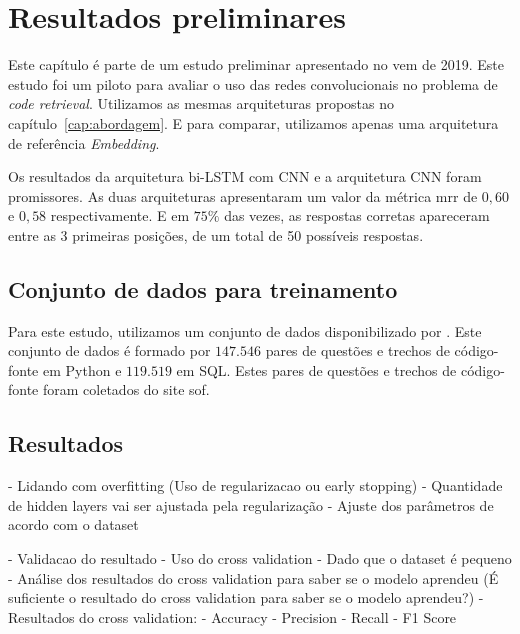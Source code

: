 \chapter{Resultados preliminares}
\label{cap:resultados-preliminares}

Este capítulo é parte de um estudo preliminar \citep{marcelo-vem-2019} apresentado no \acrfull{vem} de 2019. Este estudo foi um piloto para avaliar o uso das redes convolucionais no problema de \textit{code retrieval}. Utilizamos as mesmas arquiteturas propostas no capítulo~\ref{cap:abordagem}. E para comparar, utilizamos apenas uma arquitetura de referência \textit{Embedding}.

Os resultados da arquitetura bi-LSTM com CNN e a arquitetura CNN foram promissores. As duas arquiteturas apresentaram um valor da métrica \acrfull{mrr} de $0,60$ e $0,58$ respectivamente. E em $75\%$ das vezes, as respostas corretas apareceram entre as 3 primeiras posições, de um total de 50 possíveis respostas.

\section{Conjunto de dados para treinamento}
\label{sec:conjunto-dados-treinamento}

Para este estudo, utilizamos um conjunto de dados disponibilizado por \cite{yao-2018}. Este conjunto de dados é formado por $\bm{147.546}$ pares de questões e trechos de código-fonte em Python e $\bm{119.519}$ em SQL. Estes pares de questões e trechos de código-fonte foram coletados do site \Gls{sof}.


\section{Resultados}

 - Lidando com overfitting (Uso de regularizacao ou early stopping) - Quantidade de hidden layers vai ser ajustada pela regularização
         - Ajuste dos parâmetros de acordo com o dataset
      
          - Validacao do resultado 
             - Uso do cross validation - Dado que o dataset é pequeno
             - Análise dos resultados do cross validation para saber se o modelo aprendeu (É suficiente o resultado do cross validation para saber se o modelo aprendeu?)
              - Resultados do cross validation:
                  - Accuracy
                  - Precision
                  - Recall
                  - F1 Score
                  
